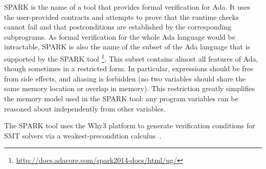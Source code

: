 \documentclass[runningheads]{llncs}
\begin{document}

SPARK is the name of a tool that provides formal verification for Ada. It uses the user-provided contracts and attempts to prove that the runtime checks cannot fail and that postconditions are established by the corresponding subprograms.
As formal verification for the whole Ada language would be intractable, SPARK is also the name of the subset of the Ada language that is supported by the SPARK tool%
\footnote{\url{http://docs.adacore.com/spark2014-docs/html/ug/}}.
This subset contains almost all features of Ada, though sometimes in a restricted form. %
In particular, expressions should be free from side effects, and aliasing is forbidden (no two variables should share the same memory location or overlap in memory).
This restriction greatly simplifies the memory model used in the SPARK tool: any program variables %
can be reasoned about independently from other variables.

The SPARK tool %
uses the Why3 platform to generate verification conditions for SMT solvers via a weakest-precondition calculus~\cite{bobot2011why3}.
\end{document}
